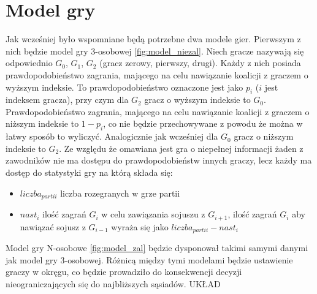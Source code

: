 \section{Model gry}
\label{sec:model}
Jak wcześniej było wspomniane będą potrzebne dwa modele gier. Pierwszym z nich będzie model gry 3-osobowej \ref{fig:model_niezal}. Niech gracze nazywają się odpowiednio $G_0$, $G_1$, $G_2$ (gracz zerowy, pierwszy, drugi). Każdy z nich posiada prawdopodobieństwo zagrania, mającego na celu nawiązanie koalicji z graczem o wyższym indeksie. To prawdopodobieństwo oznaczone jest jako $p_i$ ($i$ jest indeksem gracza), przy czym dla $G_2$ gracz o wyższym indeksie to $G_0$. Prawdopodobieństwo zagrania, mającego na celu nawiązanie koalicji z graczem o niższym indeksie to $1 - p_i$, co nie będzie przechowywane z powodu że można w łatwy sposób to wyliczyć. Analogicznie jak wcześniej dla $G_0$ gracz o niższym indeksie to $G_2$. Ze względu że omawiana jest gra o niepełnej informacji żaden z zawodników nie ma dostępu do prawdopodobieństw innych graczy, lecz każdy ma dostęp do statystyki gry na którą składa się:
\begin{itemize}
\item $liczba_{partii}$ liczba rozegranych w grze partii
\item $nast_i$ ilość zagrań $G_i$ w celu zawiązania sojuszu z $G_{i+1}$, ilość zagrań $G_{i}$ aby nawiązać sojusz z $G_{i-1}$ wyraża się jako $liczba_{partii} - nast_i$
\end{itemize}
Model gry N-osobowe \ref{fig:model_zal} będzie dysponował takimi samymi danymi jak model gry 3-osobowej. Różnicą między tymi modelami będzie ustawienie graczy w okręgu, co będzie prowadziło do konsekwencji decyzji nieograniczających się do najbliższych sąsiadów.
{\color{red} UKŁAD}
